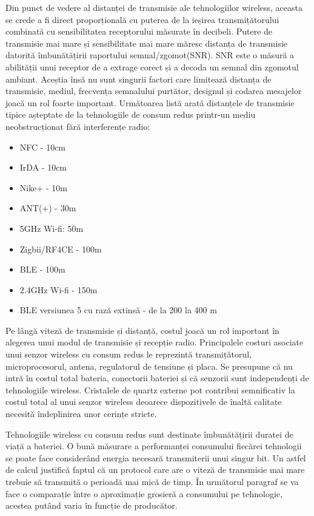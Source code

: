 \documentclass[12pt,a4paper]{report}
\begin{document}
Din punct de vedere al distanței de transmisie ale tehnologiilor wireless, aceasta se crede a fi direct proporțională cu puterea de la ieșirea transmițătorului combinată cu sensibilitatea receptorului măsurate în decibeli. Putere de transmisie mai mare și sensibilitate mai mare măresc distanța de transmisie datorită îmbunătățirii raportului semnal/zgomot(SNR). SNR este o măsură a abilității unui receptor de a extrage corect și a decoda un semnal din zgomotul ambiant. Aceștia însă nu sunt singurii factori care limitează distanța de transmisie, mediul, frecvența semnalului purtător, designul  și codarea mesajelor joacă un rol foarte important. Următoarea listă arată distanțele de transmisie tipice așteptate de la tehnologiile de consum redus printr-un mediu neobstrucționat fără interferențe radio\cite{comp1}:
\begin{itemize}
	\item NFC - 10cm
	\item IrDA - 10cm
	\item Nike+ - 10m
	\item ANT(+) - 30m
	\item 5GHz Wi-fi: 50m
	\item Zigbii/RF4CE - 100m
	\item BLE - 100m
	\item 2.4GHz Wi-fi - 150m
	\item BLE versiunea 5 cu rază extinsă - de la 200 la 400 m
\end{itemize}
Pe lângă viteză de transmisie și distanță, costul joacă un rol important în alegerea unui modul de transmisie și recepție radio. Principalele costuri asociate unui senzor wireless cu consum redus le reprezintă transmițătorul, microprocesorul, antena, regulatorul de tensiune și placa. Se presupune că nu intră în costul total bateria, conectorii bateriei și că senzorii sunt independenți de tehnologiile wireless\cite{comp2}. Cristalele de quartz externe pot contribui semnificativ la costul total al unui senzor wireless deoarece dispozitivele de înaltă calitate necesită îndeplinirea unor cerințe stricte.

Tehnologiile wireless cu consum redus sunt destinate îmbunătățirii duratei de viață a bateriei. O bună măsurare a performanței consumului fiecărei tehnologii se poate face considerând energia necesară transmiterii unui singur bit. Un astfel de calcul justifică faptul că un protocol care are o viteză de transmisie mai mare trebuie să transmită o perioadă mai mică de timp. În următorul paragraf se va face o comparație între o aproximație grosieră a consumului pe tehnologie, acestea putând varia în funcție de producător.
\end{document}
